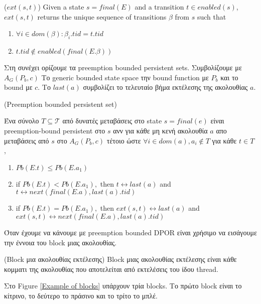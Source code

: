 \begin{definition}{($ext(s,t)$)}
    Given a state $s = final(E)$ and a transition $t \in enabled(s)$,
    $ext(s,t)$ returns the unique sequence of transitions $\beta$ from $s$
    such that
    \begin{enumerate}
        \item $\forall i \in dom(\beta): \beta_i.tid = t.tid$
        \item $t.tid \notin enabled(final(E.\beta))$
    \end{enumerate}
\end{definition}

Στη συνέχει ορίζουμε τα preemption bounded persistent sets. Συμβολίζουμε με $A_G(P_b,c)$ Το generic 
bounded state space την  bound function με $P_b$ και το bound με $c$. Το $last(a)$ συμβολίζει το τελευταίο βήμα εκτέλεσης της ακολουθίας $a$.

\begin{definition}{(Preemption bounded persistent set)}

Ένα σύνολο $T \subseteq \mathcal{T}$ από δυνατές μεταβάσεις στο state $s=final(e)$
είναι preemption-bound persistent στο $s$ ανν για κάθε μη κενή ακολουθία
$a$ απο μεταβάσεις από $s$ στο $A_G(P_b,c)$ τέτοιο ώστε 
$\forall i \in dom(a), a_i \notin T$ για κάθε $t \in T$ ,

\begin{enumerate}
\item $Pb(E.t) \leq Pb(E.a_1)$
\item if $Pb(E.t)<Pb(E.a_{1}) ,$ then $t \leftrightarrow last(a)$ and $t \leftrightarrow  next(final(E.a), last(a).tid)$
\item if $Pb(E.t)=Pb(E.a_{1}),$ then $ext(s,t) \leftrightarrow last(a)$ and $ext(s,t) \leftrightarrow next(final(E.a), last(a).tid)$
\end{enumerate}

\end{definition}

Όταν έχουμε να κάνουμε με preemption bounded DPOR είναι χρήσιμο να εισάγουμε την έννοια του block μιας ακολουθίας.

\begin{definition}{(Block μια ακολουθίας εκτέλεσης)}
    Block μιας ακολουθίας εκτέλεσης είναι κάθε κομματι της ακολουθίας που αποτελείται από εκτελέσεις του ίδου thread.
\end{definition}

Στο Figure \ref{Example of blocks} υπάρχουν τρία blocks. Το πρώτο block είναι το κίτρινο, το δεύτερο το πράσινο και το τρίτο το μπλέ.

